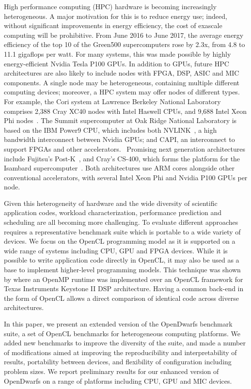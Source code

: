 \documentclass[../document.tex]{subfiles}
\begin{document}
\label{sec:introduction}
	
High performance computing (HPC) hardware is becoming increasingly heterogeneous.
A major motivation for this is to reduce energy use; indeed, without significant improvements in energy efficiency, the cost of exascale computing will be prohibitive.
From June 2016 to June 2017, the average energy efficiency of the top 10 of the Green500 supercomputers rose by 2.3x, from 4.8 to 11.1 gigaflops per watt.\cite{feldman_2017}
For many systems, this was made possible by highly energy-efficient Nvidia Tesla P100 GPUs.
In addition to GPUs, future HPC architectures are also likely to include nodes with FPGA, DSP, ASIC and MIC components.
A single node may be heterogeneous, containing multiple different computing devices; moreover, a HPC system may offer nodes of different types.
For example, the Cori system at Lawrence Berkeley National Laboratory comprises 2,388 Cray XC40 nodes with Intel Haswell CPUs, and 9,688 Intel Xeon Phi nodes~\cite{declerck2016cori}.
The Summit supercomputer at Oak Ridge National Laboratory is based on the IBM Power9 CPU, which includes both NVLINK~\cite{morgan_2016}, a high bandwidth interconnect between Nvidia GPUs; and CAPI, an interconnect to support FPGAs and other accelerators.~\cite{morgan_2017}
Promising next generation architectures include Fujitsu's Post-K~\cite{morgan_2016_postk}, and Cray's CS-400, which forms the platform for the Isambard supercomputer~\cite{feldman_2017_isambard}.
Both architectures use ARM cores alongside other conventional accelerators, with several Intel Xeon Phi and Nvidia P100 GPUs per node.

Given this heterogeneity of hardware and the wide diversity of scientific application codes, workload characterization, performance prediction and scheduling are all becoming more challenging.
To evaluate different approaches requires a representative benchmark suite which is portable to a wide variety of devices.
We focus on the OpenCL programming model as it is supported on a wide range of systems including CPU, GPU and FPGA devices.
While it is possible to write application code directly in OpenCL, it may also be used as a base to implement higher-level programming models.
This technique was shown by \citet{mitra2014implementation} where an OpenMP runtime was implemented over an OpenCL framework for Texas Instruments Keystone II DSP architecture.
Having a common back-end in the form of OpenCL allows a direct comparison of identical code across diverse architectures.

In this paper, we present an extended version of the OpenDwarfs benchmark suite, a set of OpenCL benchmarks for heterogeneous computing platforms.\cite{krommydas2016opendwarfs}
We added new benchmarks to improve the diversity of the suite, and made a number of modifications aimed at improving the reproducibility and interpretability of results, portability between devices, and flexibility of configuration including problem sizes.
We report preliminary results for our enhanced version of OpenDwarfs on a range of platforms including CPU, GPU and MIC devices.
\end{document}
